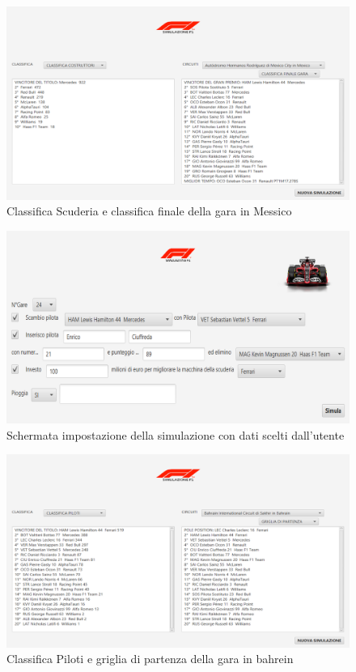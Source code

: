 \begin{figure}[h]
\centering
\includegraphics[width=1\linewidth]{images/Risultati scuderia.png}
\caption{Classifica Scuderia e classifica finale della gara in Messico}
\label{fig:Classifica Scuderia e classifica finale di una gara}
\end{figure}

\begin{figure}[h]
\centering
\includegraphics[width=1\linewidth]{images/Schermata impostazione simulazione con dati.png}
\caption{Schermata impostazione della simulazione con dati scelti dall'utente}
\label{fig:Schermata impostazione della simulazione con dati scelti dall'utente}
\end{figure}

\begin{figure}[h]
\centering
\includegraphics[width=1\linewidth]{images/Risultati ottenuti con impostazioni scelte dall'utente.png}
\caption{Classifica Piloti e griglia di partenza della gara in bahrein}
\label{fig:Classifica Piloti e griglia di partenza di una gara}
\end{figure}

